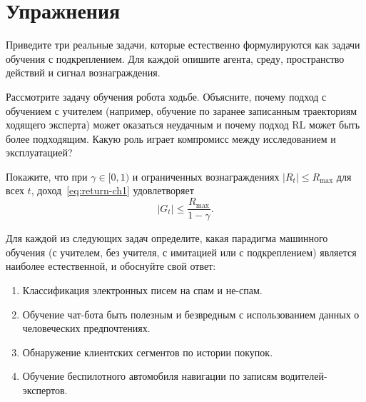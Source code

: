 \section*{Упражнения}

\begin{exercise}
\label{ex:rl-examples}
Приведите три реальные задачи, которые естественно формулируются как задачи обучения с подкреплением.  Для каждой опишите агента, среду, пространство действий и сигнал вознаграждения.
\end{exercise}

\begin{exercise}
\label{ex:sl-vs-rl}
Рассмотрите задачу обучения робота ходьбе.  Объясните, почему подход с обучением с учителем (например, обучение по заранее записанным траекториям ходящего эксперта) может оказаться неудачным и почему подход RL может быть более подходящим.  Какую роль играет компромисс между исследованием и эксплуатацией?
\end{exercise}

\begin{exercise}
\label{ex:discount}
Покажите, что при $\gamma\in[0,1)$ и ограниченных вознаграждениях $|R_t|\le R_{\max}$ для всех $t$, доход~\eqref{eq:return-ch1} удовлетворяет
\[
|G_t| \le \frac{R_{\max}}{1-\gamma}.
\]
\end{exercise}

\begin{exercise}
\label{ex:paradigm-compare}
Для каждой из следующих задач определите, какая парадигма машинного обучения (с учителем, без учителя, с имитацией или с подкреплением) является наиболее естественной, и обоснуйте свой ответ:
\begin{enumerate}[label=(\alph*)]
\item Классификация электронных писем на спам и не-спам.
\item Обучение чат-бота быть полезным и безвредным с использованием данных о человеческих предпочтениях.
\item Обнаружение клиентских сегментов по истории покупок.
\item Обучение беспилотного автомобиля навигации по записям водителей-экспертов.
\end{enumerate}
\end{exercise}
